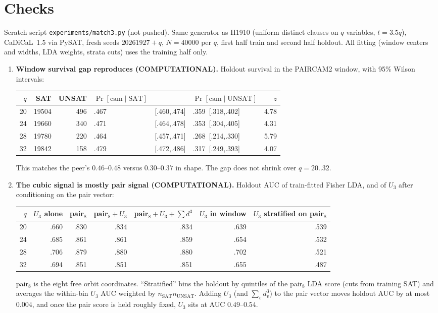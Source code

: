 \documentclass[11pt]{article}
\begin{document}
\section*{Checks}
Scratch script \texttt{experiments/match3.py} (not pushed). Same generator as H1910 (uniform distinct clauses on $q$ variables, $t=3.5q$), CaDiCaL~1.5 via PySAT, fresh seeds $20261927+q$, $N=40000$ per $q$, first half train and second half holdout. All fitting (window centers and widths, LDA weights, strata cuts) uses the training half only.
\begin{enumerate}
\item \textbf{Window survival gap reproduces (COMPUTATIONAL).} Holdout survival in the PAIRCAM2 window, with 95\% Wilson intervals:
\begin{center}
\begin{tabular}{rrrlrlr}
$q$ & SAT & UNSAT & $\Pr[\mathrm{cam}\mid\mathrm{SAT}]$ & & $\Pr[\mathrm{cam}\mid\mathrm{UNSAT}]$ & $z$\\\hline
20 & 19504 & 496 & .467 & [.460,.474] & .359\ [.318,.402] & 4.78\\
24 & 19660 & 340 & .471 & [.464,.478] & .353\ [.304,.405] & 4.31\\
28 & 19780 & 220 & .464 & [.457,.471] & .268\ [.214,.330] & 5.79\\
32 & 19842 & 158 & .479 & [.472,.486] & .317\ [.249,.393] & 4.07
\end{tabular}
\end{center}
This matches the peer's $0.46$--$0.48$ versus $0.30$--$0.37$ in shape. The gap does not shrink over $q=20..32$.
\item \textbf{The cubic signal is mostly pair signal (COMPUTATIONAL).} Holdout AUC of train-fitted Fisher LDA, and of $U_3$ after conditioning on the pair vector:
\begin{center}
\begin{tabular}{rrrrrrr}
$q$ & $U_3$ alone & pair$_8$ & pair$_8{+}U_3$ & pair$_8{+}U_3{+}\sum d^3$ & $U_3$ in window & $U_3$ stratified on pair$_8$\\\hline
20 & .660 & .830 & .834 & .834 & .639 & .539\\
24 & .685 & .861 & .861 & .859 & .654 & .532\\
28 & .706 & .879 & .880 & .880 & .702 & .521\\
32 & .694 & .851 & .851 & .851 & .655 & .487
\end{tabular}
\end{center}
pair$_8$ is the eight free orbit coordinates. ``Stratified'' bins the holdout by quintiles of the pair$_8$ LDA score (cuts from training SAT) and averages the within-bin $U_3$ AUC weighted by $n_{\mathrm{SAT}}n_{\mathrm{UNSAT}}$. Adding $U_3$ (and $\sum_v d_v^3$) to the pair vector moves holdout AUC by at most $0.004$, and once the pair score is held roughly fixed, $U_3$ sits at AUC $0.49$--$0.54$.
\end{enumerate}
\end{document}
